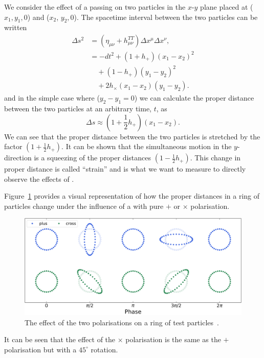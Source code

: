 We consider the effect of a passing \gw on two particles in the $x$-$y$ plane placed at ($x_{1}, y_{1}, 0$) and ($x_{2}$, $y_{2}, 0$). The spacetime interval between the two particles can be written
%
\begin{align}
    \Delta s^{2} &= \left(\eta_{\mu\nu} + h^{TT}_{\mu\nu}\right) \Delta x^{\mu} \Delta x^{\nu}, \\
    &= -dt^{2} + \left(1 + h_{+}\right)(x_{1} - x_{2})^{2} \nonumber \\
    &\quad + \left(1 - h_{+}\right)(y_{1} - y_{2})^{2} \nonumber \\
    &\quad + 2h_{\times} (x_{1} - x_{2})(y_{1} - y_{2}).
\end{align}
%
and in the simple case where ($y_{2} - y_{1} = 0$) we can calculate the proper distance between the two particles at an arbitrary time, $t$, as
%
\begin{equation}
    \Delta s \approx \left( 1 + \frac{1}{2} h_{+}\right)(x_{1} - x_{2}).
    \label{1:eq:proper_dist_two_particles}
\end{equation}
%
We can see that the proper distance between the two particles is stretched by the factor $(1 + \frac{1}{2}h_{+})$. It can be shown that the simultaneous motion in the $y$-direction is a squeezing of the proper distances $(1 - \frac{1}{2}h_{+})$. This change in proper distance is called \gwadj ``strain'' and is what we want to measure to directly observe the effects of \gws.

Figure~\ref{1:fig:ring_of_particles} provides a visual representation of how the proper distances in a ring of particles change under the influence of a \gw with pure $+$ or $\times$ polarisation.
%
\begin{figure}
   \includegraphics[width=\textwidth]{images/1_general_relativity/gravitational_radiation/polarisation.png}
   \caption{The effect of the two polarisations on a ring of test particles~\cite{gw_polarisation_plots}.}
   \label{1:fig:ring_of_particles}
\end{figure}
%
It can be seen that the effect of the $\times$ polarisation is the same as the $+$ polarisation but with a $45^{\circ}$ rotation.

